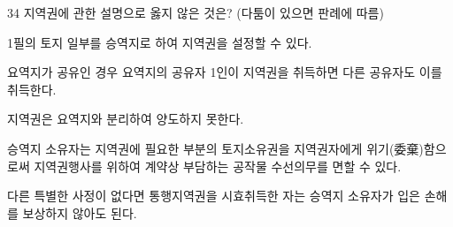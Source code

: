 \begin{question}{34}
지역권에 관한 설명으로 옳지 않은 것은? (다툼이 있으면 판례에 따름)
\begin{choices}
  \item 1필의 토지 일부를 승역지로 하여 지역권을 설정할 수 있다.
  \item 요역지가 공유인 경우 요역지의 공유자 1인이 지역권을 취득하면 다른 공유자도 이를 취득한다.
  \item 지역권은 요역지와 분리하여 양도하지 못한다.
  \item 승역지 소유자는 지역권에 필요한 부분의 토지소유권을 지역권자에게 위기(委棄)함으로써 지역권행사를 위하여 계약상 부담하는 공작물 수선의무를 면할 수 있다.
  \item 다른 특별한 사정이 없다면 통행지역권을 시효취득한 자는 승역지 소유자가 입은 손해를 보상하지 않아도 된다.
\end{choices}
\end{question}
